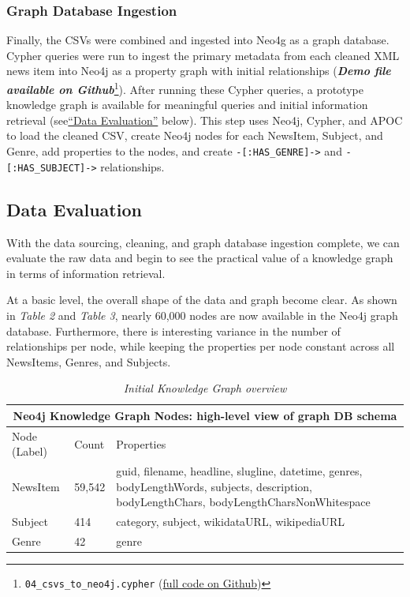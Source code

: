\documentclass[11pt]{article}
\begin{document}
    \subsubsection{Graph Database Ingestion}

    Finally, the CSVs were combined and ingested into Neo4g as a graph database. Cypher queries were run to ingest the primary metadata from each cleaned XML news item into Neo4j as a property graph with initial relationships (\textit{\textbf{Demo file available on Github}}\footnote{\lstinline{04_csvs_to_neo4j.cypher} (\href{https://github.com/Birkbeck/msc-data-science-project-2020_21---files-heychrisek/}{full code on Github})}). After running these Cypher queries, a prototype knowledge graph is available for meaningful queries and initial information retrieval (see\hyperref[sec:DataSetEvaluation]{``Data Evaluation''} below). This step uses Neo4j, Cypher, and APOC to load the cleaned CSV, create Neo4j nodes for each NewsItem, Subject, and Genre, add properties to the nodes, and create \lstinline{-[:HAS_GENRE]->} and \lstinline{-[:HAS_SUBJECT]->} relationships.


  \subsection{Data Evaluation}
  \label{sec:DataSetEvaluation}

  With the data sourcing, cleaning, and graph database ingestion complete, we can evaluate the raw data and begin to see the practical value of a knowledge graph in terms of information retrieval.

  At a basic level, the overall shape of the data and graph become clear. As shown in \textit{Table 2} and \textit{Table 3}, nearly 60,000 nodes are now available in the Neo4j graph database. Furthermore, there is interesting variance in the number of relationships per node, while keeping the properties per node constant across all NewsItems, Genres, and Subjects.


  \begin{table}
    \begin{tabular}{ |p{3cm}||p{2cm}|p{7cm}|  }
    \hline
    \multicolumn{3}{|c|}{Neo4j Knowledge Graph Nodes: high-level view of graph DB schema} \\
    \hline
    Node (Label)& Count &Properties\\
    \hline
    NewsItem&59,542&guid, filename, headline, slugline, datetime, genres, bodyLengthWords, subjects, description, bodyLengthChars, bodyLengthCharsNonWhitespace\\
    \hline
    Subject&414&category, subject, wikidataURL, wikipediaURL\\
    \hline
    Genre&42&genre\\
    \hline
    \end{tabular}
    \caption{\textit{Initial Knowledge Graph overview}}
  \end{table}
\end{document}
